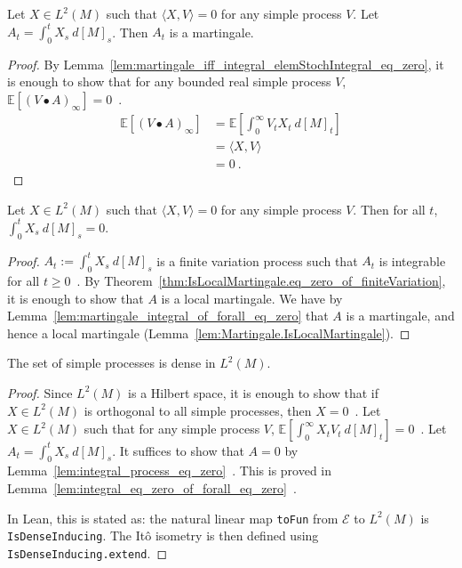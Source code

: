 \begin{lemma}\label{lem:martingale_integral_of_forall_eq_zero}
Let $X \in L^2(M)$ such that $\langle X, V\rangle = 0$ for any simple process $V$. Let $A_t = \int_0^t X_s \: d[M]_s$. Then $A_t$ is a martingale.
\end{lemma}

\begin{proof}
By Lemma~\ref{lem:martingale_iff_integral_elemStochIntegral_eq_zero}, it is enough to show that for any bounded real simple process $V$, $\mathbb{E}[(V \bullet A)_\infty] = 0$~.
\begin{align*}
  \mathbb{E}\left[(V \bullet A)_\infty\right]
  &= \mathbb{E}\left[ \int_0^{\infty} V_t X_t \: d[M]_t \right]
  \\
  &= \langle X, V \rangle
  \\
  &= 0
  \: .
\end{align*}
\end{proof}


\begin{lemma}\label{lem:integral_eq_zero_of_forall_eq_zero}
Let $X \in L^2(M)$ such that $\langle X, V\rangle = 0$ for any simple process $V$. Then for all $t$, $\int_0^t X_s \: d[M]_s = 0$.
\end{lemma}

\begin{proof}
$A_t := \int_0^t X_s \: d[M]_s$ is a finite variation process such that $A_t$ is integrable for all $t \ge 0$~.
By Theorem~\ref{thm:IsLocalMartingale.eq_zero_of_finiteVariation}, it is enough to show that $A$ is a local martingale. We have by Lemma~\ref{lem:martingale_integral_of_forall_eq_zero} that $A$ is a martingale, and hence a local martingale (Lemma~\ref{lem:Martingale.IsLocalMartingale}).
\end{proof}


\begin{lemma}\label{lem:dense_simpleProcess}
The set of simple processes is dense in $L^2(M)$.
\end{lemma}

\begin{proof}
Since $L^2(M)$ is a Hilbert space, it is enough to show that if $X \in L^2(M)$ is orthogonal to all simple processes, then $X = 0$~.
Let $X \in L^2(M)$ such that for any simple process $V$, $\mathbb{E}\left[ \int_0^{\infty} X_t V_t \: d[M]_t \right] = 0$~.
Let $A_t = \int_0^t X_s \: d[M]_s$.
It suffices to show that $A = 0$ by Lemma~\ref{lem:integral_process_eq_zero}~.
This is proved in Lemma~\ref{lem:integral_eq_zero_of_forall_eq_zero}~.

In Lean, this is stated as: the natural linear map \texttt{toFun} from $\mathcal{E}$ to $L^2(M)$
is \texttt{IsDenseInducing}. The Itô isometry is then defined using \texttt{IsDenseInducing.extend}.
\end{proof}


